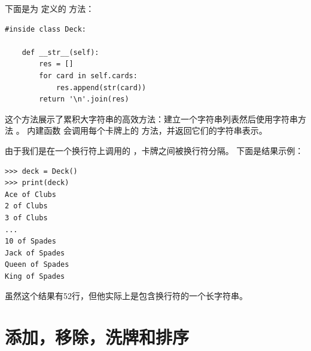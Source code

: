 
下面是为  定义的  方法：

\begin{lstlisting}
#inside class Deck:

    def __str__(self):
        res = []
        for card in self.cards:
            res.append(str(card))
        return '\n'.join(res)
\end{lstlisting}

%

这个方法展示了累积大字符串的高效方法：建立一个字符串列表然后使用字符串方法 。
内建函数  会调用每个卡牌上的  方法，并返回它们的字符串表示。

 
  


由于我们是在一个换行符上调用的  ，卡牌之间被换行符分隔。  下面是结果示例：

\begin{lstlisting}
>>> deck = Deck()
>>> print(deck)
Ace of Clubs
2 of Clubs
3 of Clubs
...
10 of Spades
Jack of Spades
Queen of Spades
King of Spades
\end{lstlisting}

%

虽然这个结果有52行，但他实际上是包含换行符的一个长字符串。

\section{添加，移除，洗牌和排序}


